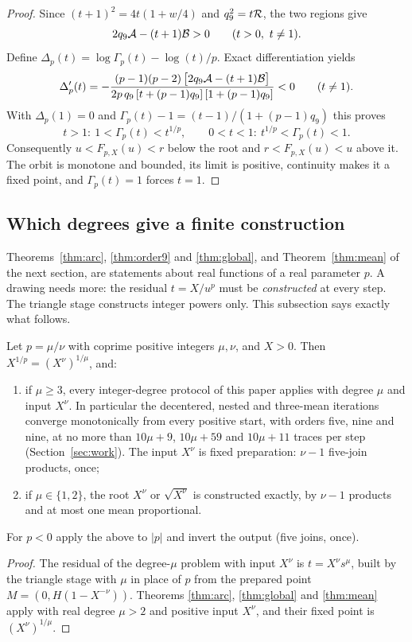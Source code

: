 \begin{proof}
Since $(t+1)^{2}=4t(1+w/4)$ and $q_9^{2}=t\mathcal{R}$, the two regions give
\begin{equation}\label{eq:sign}
2q_9\mathcal{A}-(t+1)\mathcal{B}>0\qquad(t>0,\ t\neq1).
\end{equation}
Define $\Delta_p(t)=\log\Gamma_p(t)-\log(t)/p$. Exact differentiation yields
\begin{equation}\label{eq:Dprime}
\Delta_p'(t)=-\frac{(p-1)(p-2)\,\bigl[2q_9\mathcal{A}-(t+1)\mathcal{B}\bigr]}{2p\,q_9\,[t+(p-1)q_9]\,[1+(p-1)q_9]}<0\qquad(t\neq1).
\end{equation}
With $\Delta_p(1)=0$ and $\Gamma_p(t)-1=(t-1)/(1+(p-1)q_9)$ this proves
\[ t>1:\ 1<\Gamma_p(t)<t^{1/p},\qquad 0<t<1:\ t^{1/p}<\Gamma_p(t)<1 . \]
Consequently $u<F_{p,X}(u)<r$ below the root and $r<F_{p,X}(u)<u$ above it. The orbit is monotone and
bounded, its limit is positive, continuity makes it a fixed point, and $\Gamma_p(t)=1$ forces $t=1$.
\end{proof}

\subsection{Which degrees give a finite construction}\label{sec:degrees}

Theorems~\ref{thm:arc}, \ref{thm:order9} and \ref{thm:global}, and Theorem~\ref{thm:mean} of the next
section, are statements about real functions of a real parameter $p$. A drawing needs more: the residual $t=X/u^{p}$ must be \emph{constructed} at every
step. The triangle stage constructs integer powers only. This subsection says exactly what follows.

\begin{proposition}\label{prop:rational}
Let $p=\mu/\nu$ with coprime positive integers $\mu,\nu$, and $X>0$. Then $X^{1/p}=(X^{\nu})^{1/\mu}$,
and:
\begin{enumerate}[label=(\roman*)]
\item if $\mu\ge3$, every integer-degree protocol of this paper applies with degree $\mu$ and input
  $X^{\nu}$. In particular the decentered, nested and three-mean iterations converge monotonically
  from every positive start, with orders five, nine and nine, at no more than $10\mu+9$, $10\mu+59$ and
  $10\mu+11$ traces per step (Section~\ref{sec:work}). The input $X^{\nu}$ is fixed preparation: $\nu-1$ five-join products, once;
\item if $\mu\in\{1,2\}$, the root $X^{\nu}$ or $\sqrt{X^{\nu}}$ is constructed exactly, by $\nu-1$
  products and at most one mean proportional.
\end{enumerate}
For $p<0$ apply the above to $|p|$ and invert the output (five joins, once).
\end{proposition}
\begin{proof}
The residual of the degree-$\mu$ problem with input $X^{\nu}$ is $t=X^{\nu}s^{\mu}$, built by the
triangle stage with $\mu$ in place of $p$ from the prepared point $M=(0,H(1-X^{-\nu}))$. Theorems
\ref{thm:arc}, \ref{thm:global} and \ref{thm:mean} apply with real degree $\mu>2$ and positive input
$X^{\nu}$, and their fixed point is $(X^{\nu})^{1/\mu}$.
\end{proof}

